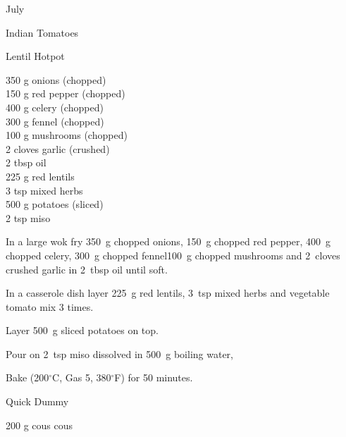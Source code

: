 \begin{menu}{July}
\begin{recipe}{2}{Indian Tomatoes}
\begin{instructions}
    \end{instructions}
    \end{recipe}%
  
    \begin{recipe}{2}{Lentil Hotpot}%
		\begin{ingredients}
		350 g onions (chopped) \\
	150 g red pepper (chopped) \\
	400 g celery (chopped) \\
	300 g fennel (chopped) \\
	100 g mushrooms (chopped) \\
	2 cloves garlic (crushed) \\
	2 tbsp oil  \\
	225 g red lentils  \\
	3 tsp mixed herbs  \\
	500 g potatoes (sliced) \\
	2 tsp miso  \\
	
		\end{ingredients}
	
	
    \begin{instructions}
    \item 
        In a large wok fry
        350~g chopped onions,
        150~g chopped red pepper,
        400~g chopped celery,
        300~g chopped fennel100~g chopped mushrooms
        and
        2~cloves crushed garlic
        in
        2~tbsp  oil
        until soft.
      \item 
        In a casserole dish layer
        225~g  red lentils,
        3~tsp  mixed herbs
        and vegetable tomato mix 3 times.
      \item 
        Layer 500~g sliced potatoes on top.
      \item 
        Pour on
        2~tsp  miso
        dissolved in
        500~g  boiling water,
      \item 
        Bake (200$^{\circ}$C, Gas 5, 380$^{\circ}$F) for 50 minutes.
      
    \end{instructions}
    \end{recipe}%
  
    \begin{recipe}{1}{Quick Dummy}%
		\begin{ingredients}
		200 g cous cous  \\
	

\end{ingredients}
\end{recipe}
\end{menu}
